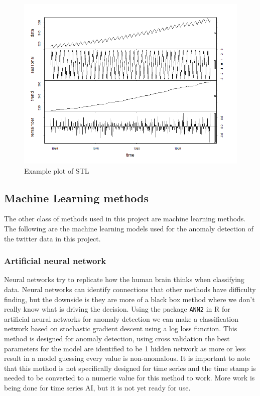 \documentclass{article}
\begin{document}
\begin{figure}[!ht]
    \centering
    \includegraphics[width=.6\textwidth]{stl_model.png}
    \caption{Example plot of STL}
    \label{fig:stl_fig}
\end{figure}

\subsection{Machine Learning methods}
The other class of methods used in this project are machine learning methods. The following are the machine learning models used for the anomaly detection of the twitter data in this project.

\subsubsection{Artificial neural network}
Neural networks try to replicate how the human brain thinks when classifying data. Neural networks can identify connections that other methods have difficulty finding, but the downside is they are more of a black box method where we don't really know what is driving the decision. Using the package \texttt{ANN2} in R for artificial neural networks for anomaly detection we can make a classification network based on stochastic gradient descent using a log loss function. This method is designed for anomaly detection, using cross validation the best parameters for the model are identified to be 1 hidden network as more or less result in a model guessing every value is non-anomalous. It is important to note that this mothod is not specifically designed for time series and the time stamp is needed to be converted to a numeric value for this method to work. More work is being done for time series AI, but it is not yet ready for use.
\end{document}
